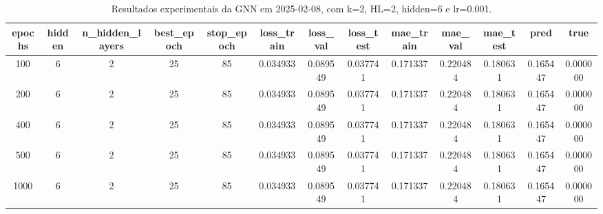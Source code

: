\begin{table}[h]
\centering
\caption{Resultados experimentais da GNN em 2025-02-08, com k=2, HL=2, hidden=6 e lr=0.001.}
\label{tab:gnn_results_k2_hl2_h6_d20250208}
\begin{tabular}{ccccccccccccc}
\toprule
epochs & hidden & n\_hidden\_layers & best\_epoch & stop\_epoch & loss\_train & loss\_val & loss\_test & mae\_train & mae\_val & mae\_test & pred & true \\
\midrule
100 & 6 & 2 & 25 & 85 & 0.034933 & 0.089549 & 0.037741 & 0.171337 & 0.220484 & 0.180631 & 0.165447 & 0.000000 \\
200 & 6 & 2 & 25 & 85 & 0.034933 & 0.089549 & 0.037741 & 0.171337 & 0.220484 & 0.180631 & 0.165447 & 0.000000 \\
400 & 6 & 2 & 25 & 85 & 0.034933 & 0.089549 & 0.037741 & 0.171337 & 0.220484 & 0.180631 & 0.165447 & 0.000000 \\
500 & 6 & 2 & 25 & 85 & 0.034933 & 0.089549 & 0.037741 & 0.171337 & 0.220484 & 0.180631 & 0.165447 & 0.000000 \\
1000 & 6 & 2 & 25 & 85 & 0.034933 & 0.089549 & 0.037741 & 0.171337 & 0.220484 & 0.180631 & 0.165447 & 0.000000 \\
\bottomrule
\end{tabular}
\end{table}
